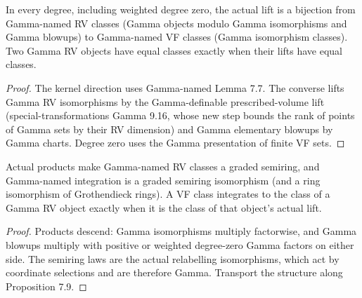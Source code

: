 \begin{proposition}

\label{s7-gn-9}


\leanok

In every degree, including weighted degree zero, the actual lift is a bijection from Gamma-named RV classes (Gamma objects modulo Gamma isomorphisms and Gamma blowups) to Gamma-named VF classes (Gamma isomorphism classes). Two Gamma RV objects have equal classes exactly when their lifts have equal classes.

\end{proposition}

\begin{proof}


\leanok

The kernel direction uses Gamma-named Lemma 7.7. The converse lifts Gamma RV isomorphisms by the Gamma-definable prescribed-volume lift (special-transformations Gamma 9.16, whose new step bounds the rank of points of Gamma sets by their RV dimension) and Gamma elementary blowups by Gamma charts. Degree zero uses the Gamma presentation of finite VF sets.

\end{proof}

\begin{theorem}

\label{s7-gn-10}


\leanok

Actual products make Gamma-named RV classes a graded semiring, and Gamma-named integration is a graded semiring isomorphism (and a ring isomorphism of Grothendieck rings). A VF class integrates to the class of a Gamma RV object exactly when it is the class of that object's actual lift.

\end{theorem}

\begin{proof}


\leanok

Products descend: Gamma isomorphisms multiply factorwise, and Gamma blowups multiply with positive or weighted degree-zero Gamma factors on either side. The semiring laws are the actual relabelling isomorphisms, which act by coordinate selections and are therefore Gamma. Transport the structure along Proposition 7.9.

\end{proof}

